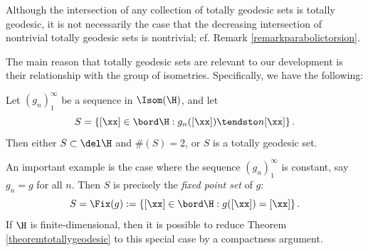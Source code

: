 \begin{warning*}
Although the intersection of any collection of totally geodesic sets is totally geodesic, it is not necessarily the case that the decreasing intersection of nontrivial totally geodesic sets is nontrivial; cf. Remark \ref{remarkparabolictorsion}.
\end{warning*}


The main reason that totally geodesic sets are relevant to our development is their relationship with the group of isometries. Specifically, we have the following:
\begin{theorem}
\label{theoremtotallygeodesic}
Let $(g_n)_1^\infty$ be a sequence in $\Isom(\H)$, and let
\begin{equation}
\label{fixedROSSONCT}
S = \left\{[\xx]\in\bord\H : g_n([\xx]) \tendsto n [\xx]\right\}.
\end{equation}
Then either $S\subset\del\H$ and $\#(S) = 2$, or $S$ is a totally geodesic set.
\end{theorem}
\begin{remark}
\label{remarktotallygeodesic}
An important example is the case where the sequence $(g_n)_1^\infty$ is constant, say $g_n = g$ for all $n$. Then $S$ is precisely the \emph{fixed point set} of $g$:
\[
S = \Fix(g) := \left\{[\xx]\in\bord\H : g([\xx]) = [\xx]\right\}.
\]
If $\H$ is finite-dimensional, then it is possible to reduce Theorem \ref{theoremtotallygeodesic} to this special case by a compactness argument.
\end{remark}
